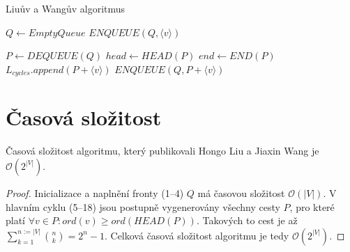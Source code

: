         \newpage

        \begin{algorithm}
            \DontPrintSemicolon
            \caption{Liuův a Wangův algoritmus}
            \vspace*{0.5em}

            \;
            $Q \leftarrow EmptyQueue$\;
            {
                $ENQUEUE(Q, \langle v \rangle)$\;
            }
            \vspace*{0.5em}

            {
                $P \leftarrow \mathit{DEQUEUE}(Q)$\;
                $head \leftarrow \mathit{HEAD}(P)$\;
                $end \leftarrow \mathit{END}(P)$\;
                {
                    {
                        $L_{cycles}.append(P + \langle v \rangle)$\;
                    }
                    {
                        {
                            $\mathit{ENQUEUE}(Q, P + \langle v \rangle)$\;
                        }
                    }
                }
            }
            \vspace*{0.5em}


        \end{algorithm}

    \section{Časová složitost}
        \begin{theorem}
            Časová složitost algoritmu, který publikovali Hongo Liu a Jiaxin Wang je $\mathcal{O}(2^{|V|})$.
        \end{theorem}

        \begin{proof}
            Inicializace a naplnění fronty (1--4) $Q$ má časovou složitost $\mathcal{O}(|V|)$. V hlavním cyklu (5--18) jsou postupně vygenerovány všechny cesty $P$, pro které platí $\forall v \in P: ord(v) \geq ord(HEAD(P))$. Takových to cest je až $\sum_{k=1}^{n:= |V|} {n \choose k} = 2^n - 1$. Celková časová složitost algoritmu je tedy $\mathcal{O}(2^{|V|})$.
        \end{proof}

